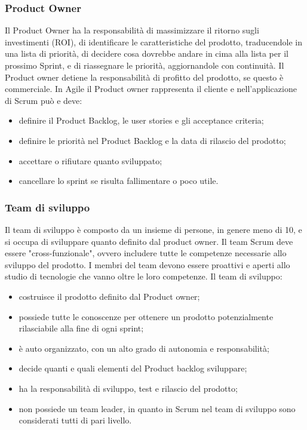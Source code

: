 \subsubsection{Product Owner}
Il Product Owner ha la responsabilità di massimizzare il ritorno sugli investimenti (ROI), di identificare le caratteristiche del prodotto, traducendole in una lista di priorità, di decidere cosa dovrebbe andare in cima alla lista per il prossimo Sprint, e di riassegnare le priorità, aggiornandole con continuità. Il Product owner detiene la responsabilità di profitto del prodotto, se questo è commerciale. In Agile il Product owner rappresenta il cliente e nell'applicazione di Scrum può e deve:
\begin{itemize}
    \item definire il Product Backlog, le user stories e gli acceptance criteria;
    \item definire le priorità nel Product Backlog e la data di rilascio del prodotto;
    \item accettare o rifiutare quanto sviluppato;
    \item cancellare lo sprint se risulta fallimentare o poco utile.
\end{itemize}


\subsubsection{Team di sviluppo}
Il team di sviluppo è composto da un insieme di persone, in genere meno di 10, e si occupa di sviluppare quanto definito dal product owner. Il team Scrum deve essere "cross-funzionale", ovvero includere tutte le competenze necessarie allo sviluppo del prodotto. I membri del team devono essere proattivi e aperti allo studio di tecnologie che vanno oltre le loro competenze.
Il team di sviluppo:
\begin{itemize}
    \item costruisce il prodotto definito dal Product owner;
    \item possiede tutte le conoscenze per ottenere un prodotto potenzialmente rilasciabile alla fine di ogni sprint;
    \item è auto organizzato, con un alto grado di autonomia e responsabilità;
    \item decide quanti e quali elementi del Product backlog sviluppare;
    \item ha la responsabilità di sviluppo, test e rilascio del prodotto;
    \item non possiede un team leader, in quanto in Scrum nel team di sviluppo sono considerati tutti di pari livello.
\end{itemize}

